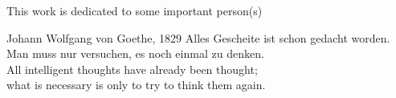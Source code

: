\documentclass[hidelinks, a4paper, nobind]{conf/uhhltthesis}
\begin{document}
\begin{romanpages}

\maketitle

\begin{dedication}
  This work is dedicated to some important person(s)
\end{dedication}

\begin{acknowledgements}
  
\end{acknowledgements}

\begin{themedquote}{Johann Wolfgang von Goethe, 1829}
  Alles Gescheite ist schon gedacht worden.\\
Man muss nur versuchen, es noch einmal zu denken. \\[\baselineskip]

All intelligent thoughts have already been thought;\\
what is necessary is only to try to think them again.
\end{themedquote}

\begin{abstract}
  
\end{abstract}

\begin{germanabstract}
  
\end{germanabstract}

\dominitoc %

\flushbottom

{%
  \setcounter{page}{0}%
  \hypersetup{%
	  linkcolor=black%
  }%
  \tableofcontents%
}%
\flushbottom


\end{romanpages}
\end{document}
